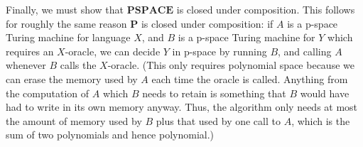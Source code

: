 \documentclass{article}
\renewcommand{\P}{\mathbf{P}}
\newcommand{\PSPACE}{\mathbf{PSPACE}}
\newcommand{\TIME}{\mathbf{TIME}}
\newcommand{\E}{\mathbf{E}}
\begin{document}
	Finally, we must show that $\PSPACE$ is closed under composition.  This follows for roughly the same reason $\P$ is closed under composition: if $A$ is a p-space Turing machine for language $X$, and $B$ is a p-space Turing machine for $Y$ which requires an $X$-oracle, we can decide $Y$ in p-space by running $B$, and calling $A$ whenever $B$ calls the $X$-oracle.  (This only requires polynomial space because we can erase the memory used by $A$ each time the oracle is called.  Anything from the computation of $A$ which $B$ needs to retain is something that $B$ would have had to write in its own memory anyway.  Thus, the algorithm only needs at most the amount of memory used by $B$ plus that used by one call to $A$, which is the sum of two polynomials and hence polynomial.)








	
\end{document}
